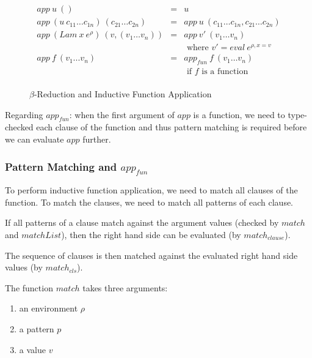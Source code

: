 \documentclass[acmsmall]{acmart}
\begin{document}
\begin{figure}[H]
  \begin{equation*}
    \begin{aligned}
      app \: u \: ()                                             & = & u                                                      \\
      app \: (u \: c_{11} \dots c_{1n}) \: (c_{21} \dots c_{2n}) & = & app \: u \: (c_{11} \dots c_{1n}, c_{21} \dots c_{2n}) \\
      app \: (Lam \: x \: e^{\rho}) \: (v,(v_1 \dots v_n))       & = & app \: v' \: (v_1 \dots v_n)                           \\
                                                                 &   & \textrm{ where } v' = eval \: e^{\rho,x=v}             \\
      app \: f \: (v_1 ... v_n)                                  & = & app_{fun} \: f \: (v_1 \dots v_n)                      \\
                                                                 &   & \textrm{ if } f \textrm{ is a function }               \\
    \end{aligned}
  \end{equation*}
  \caption{$\beta$-Reduction and Inductive Function Application}
\end{figure}

Regarding $app_{fun}$: when the first argument of $app$ is a function, we need to type-checked each
clause of the function and thus pattern matching is required before we can evaluate $app$ further.

\subsubsection{Pattern Matching and $app_{fun}$}

To perform inductive function application, we need to match all clauses
of the function. To match the clauses, we need to match all patterns of
each clause. 

If all patterns of a clause match against the argument values (checked by $match$ and $matchList$), then
the right hand side can be evaluated (by $match_{clause}$). 

The sequence of clauses is then matched against the evaluated right hand side values (by $match_{cls}$).

The function $match$ takes three arguments:

\begin{enumerate}
  \item an environment $\rho$
  \item a pattern $p$
  \item a value $v$
\end{enumerate}
\end{document}

